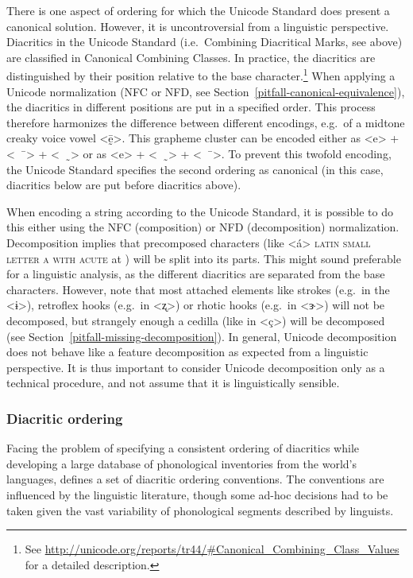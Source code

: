 There is one aspect of ordering for which
the Unicode Standard does present a canonical solution. However, it is uncontroversial
from a linguistic perspective. Diacritics in the Unicode Standard
(i.e.~Combining Diacritical Marks, see above) are classified in Canonical
Combining Classes. In practice, the diacritics are distinguished by their
position relative to the base character.\footnote{See
\url{http://unicode.org/reports/tr44/\#Canonical\_Combining\_Class\_Values} for a
detailed description.} When applying a Unicode normalization (NFC or NFD, see
Section~\ref{pitfall-canonical-equivalence}), the diacritics in different
positions are put in a specified order. This process therefore harmonizes the
difference between different encodings, e.g.\ of a midtone creaky voice
vowel <ḛ̄>. This grapheme cluster can be encoded either as <e> + <\ \ ̄> + <\ \
̰> or as <e> + <\ \ ̰> + <\ \ ̄>. To prevent this twofold encoding, the Unicode
Standard specifies the second ordering as canonical (in this case, diacritics
below are put before diacritics above).

When encoding a string according to the Unicode Standard, it is possible to do
this either using the NFC (composition) or NFD (decomposition) normalization.
Decomposition implies that precomposed characters (like <á> \textsc{latin small
letter a with acute} at \uni{00E1}) will be split into its parts. This might
sound preferable for a linguistic analysis, as the different diacritics are
separated from the base characters. However, note that most attached elements
like strokes (e.g.~in the <ɨ>), retroflex hooks (e.g.~in <ʐ>) or rhotic hooks
(e.g.~in <ɝ>) will not be decomposed, but strangely enough a cedilla (like in
<ç>) will be decomposed (see Section~\ref{pitfall-missing-decomposition}). In
general, Unicode decomposition does not behave like a feature decomposition as
expected from a linguistic perspective. It is thus important to consider Unicode
decomposition only as a technical procedure, and not assume that it is
linguistically sensible.

\subsubsection*{Diacritic ordering}

Facing the problem of specifying a consistent ordering of diacritics while
developing a large database of phonological inventories from the world's
languages, \citet[540]{Moran2012} defines a set of diacritic ordering
conventions. The conventions are influenced by the linguistic literature, though
some ad-hoc decisions had to be taken given the vast variability of phonological segments 
described by linguists. 

